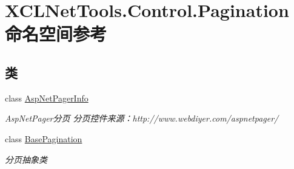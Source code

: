 \hypertarget{namespace_x_c_l_net_tools_1_1_control_1_1_pagination}{}\section{X\+C\+L\+Net\+Tools.\+Control.\+Pagination 命名空间参考}
\label{namespace_x_c_l_net_tools_1_1_control_1_1_pagination}
\subsection*{类}
\begin{DoxyCompactItemize}
\item 
class \hyperlink{class_x_c_l_net_tools_1_1_control_1_1_pagination_1_1_asp_net_pager_info}{Asp\+Net\+Pager\+Info}
\begin{DoxyCompactList}\small\item\em Asp\+Net\+Pager分页 分页控件来源：http\+://www.webdiyer.\+com/aspnetpager/ \end{DoxyCompactList}\item 
class \hyperlink{class_x_c_l_net_tools_1_1_control_1_1_pagination_1_1_base_pagination}{Base\+Pagination}
\begin{DoxyCompactList}\small\item\em 分页抽象类 \end{DoxyCompactList}\end{DoxyCompactItemize}
